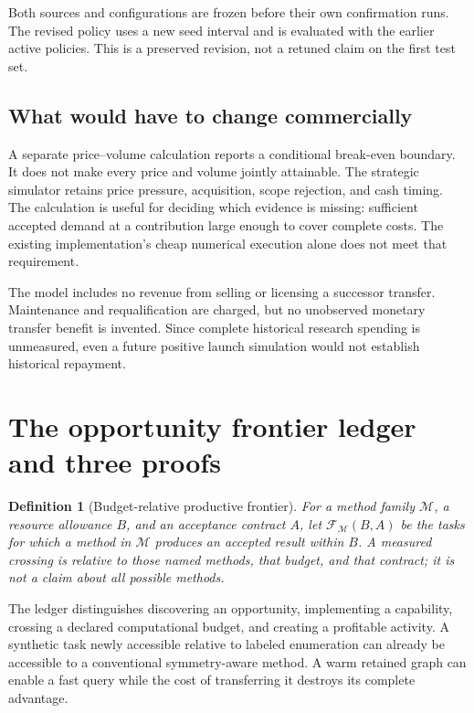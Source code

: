 \documentclass[11pt,letterpaper]{article}
\newtheorem{definition}{Definition}
\newcommand{\F}{\mathcal F}
\begin{document}
Both sources and configurations are frozen before their own confirmation runs.
The revised policy uses a new seed interval and is evaluated with the earlier active
policies. This is a preserved revision, not a retuned claim on the first test set.



\subsection{What would have to change commercially}

A separate price--volume calculation reports a conditional break-even boundary. It
does not make every price and volume jointly attainable. The strategic simulator
retains price pressure, acquisition, scope rejection, and cash timing. The calculation
is useful for deciding which evidence is missing: sufficient accepted demand at a
contribution large enough to cover complete costs. The existing implementation's
cheap numerical execution alone does not meet that requirement.

The model includes no revenue from selling or licensing a successor transfer.
Maintenance and requalification are charged, but no unobserved monetary transfer
benefit is invented. Since complete historical research spending is unmeasured, even
a future positive launch simulation would not establish historical repayment.

\section{The opportunity frontier ledger and three proofs}

\begin{definition}[Budget-relative productive frontier]
For a method family $\mathcal M$, a resource allowance $B$, and an acceptance contract
$A$, let $\F_{\mathcal M}(B,A)$ be the tasks for which a method in $\mathcal M$ produces
an accepted result within $B$. A measured crossing is relative to those named methods,
that budget, and that contract; it is not a claim about all possible methods.
\end{definition}

The ledger distinguishes discovering an opportunity, implementing a capability,
crossing a declared computational budget, and creating a profitable activity. A
synthetic task newly accessible relative to labeled enumeration can already be
accessible to a conventional symmetry-aware method. A warm retained graph can enable
a fast query while the cost of transferring it destroys its complete advantage.
\end{document}
